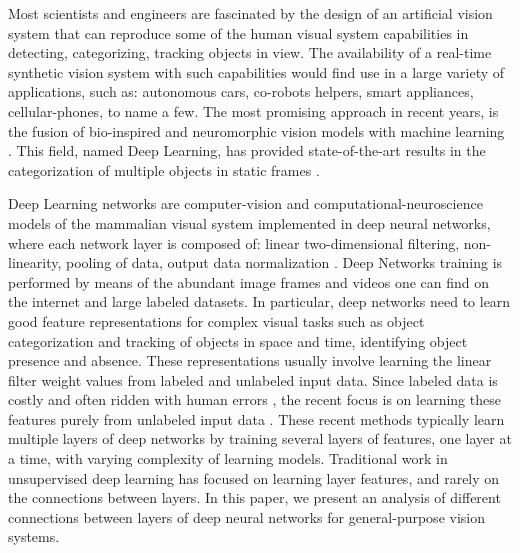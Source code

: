 \documentclass{article} %
\begin{document}
Most scientists and engineers are fascinated by the design of an artificial vision system that can 
reproduce some of the human visual system capabilities in detecting, categorizing, tracking objects in view. 
The availability of a real-time synthetic vision system with such capabilities would find use in a large 
variety of applications, such as: autonomous cars, co-robots helpers, smart appliances, cellular-phones, to name a few. 
The most promising approach in recent years, is the fusion of bio-inspired and neuromorphic vision models with machine learning 
\cite{lecun_gradient-based_1998,hadsell_dimensionality_2006,gregor_structured_2011,riesenhuber_hierarchical_1999,serre_feedforward_2007,serre_neuromorphic_2010,jarrett_what_2009,lecun_convolutional_2010,boureau_theoretical_2010}. This field, named Deep Learning, has provided state-of-the-art results in the categorization 
of multiple objects in static frames \cite{krizhevsky_imagenet_2012}.

Deep Learning networks are computer-vision and computational-neuroscience models of the mammalian visual 
system implemented in deep neural networks, where each network layer is composed of: linear two-dimensional filtering, 
non-linearity, pooling of data, output data normalization \cite{jarrett_what_2009,lecun_convolutional_2010,boureau_theoretical_2010}. 
Deep Networks training is performed by means of the abundant image frames and videos one can find on the internet and large labeled datasets. 
In particular, deep networks need to learn good feature representations for complex visual tasks such as object categorization and 
tracking of objects in space and time, identifying object presence and absence. These representations usually involve learning the linear 
filter weight values from labeled and unlabeled input data. Since labeled data is costly and often ridden with human errors 
\cite{karpathy_lessons_2011, torralba_unbiased_2011, hou_meta-theory_2012}, the recent focus is on learning these features purely 
from unlabeled input data \cite{olshausen_emergence_1996, hyvarinen_independent_2000, hinton_fast_2006, vincent_extracting_2008, coates_analysis_2011}.
 These recent methods typically learn multiple layers of deep networks by training several layers of features, one layer at a time, with varying complexity of 
 learning models. Traditional work in unsupervised deep learning has focused on learning layer features, and rarely on the connections 
 between layers. In this paper, we present an analysis of different connections between layers of deep neural networks for general-purpose vision systems. 
\end{document}
